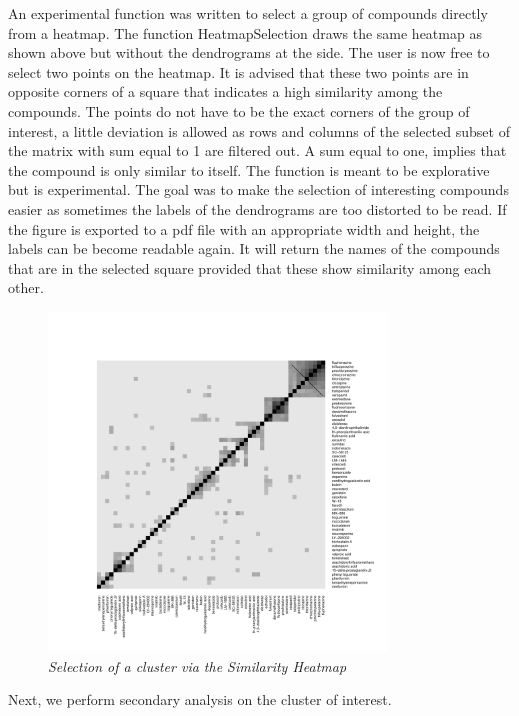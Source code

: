 \documentclass[a4paper]{article}
\begin{document}
\noindent An experimental function was written to select a group of compounds
directly from a heatmap. The function HeatmapSelection draws the same
heatmap as shown above but without the dendrograms at the side. The user is now
free to select two points on the heatmap. It is advised that these two points
are in opposite corners of a square that indicates a high similarity among the
compounds. The points do not have to be the exact corners of the group of
interest, a little deviation is allowed as rows and columns of the selected
subset of the matrix with sum equal to 1 are filtered out. A sum equal to one,
implies that the compound is only similar to itself. The function is meant to be
explorative but is experimental. The goal was to make the selection of
interesting compounds easier as sometimes the labels of the dendrograms are too
distorted to be read. If the figure is exported to a pdf file with an
appropriate width and height, the labels can be become readable again. It will
return the names of the compounds that are in the selected square provided that
these show similarity among each other.
\begin{Schunk}
\end{Schunk}
\vspace{-1.0cm}
\begin{figure}[H]
\centering
\includegraphics[width=9cm,height=9cm]{HeatmapSelection_MCF7W.pdf}
\caption{{\it Selection of a cluster via the Similarity Heatmap}\label{SimMap}}
\end{figure}
\noindent Next, we perform secondary analysis
on the cluster of interest.
\newpage
\end{document}
